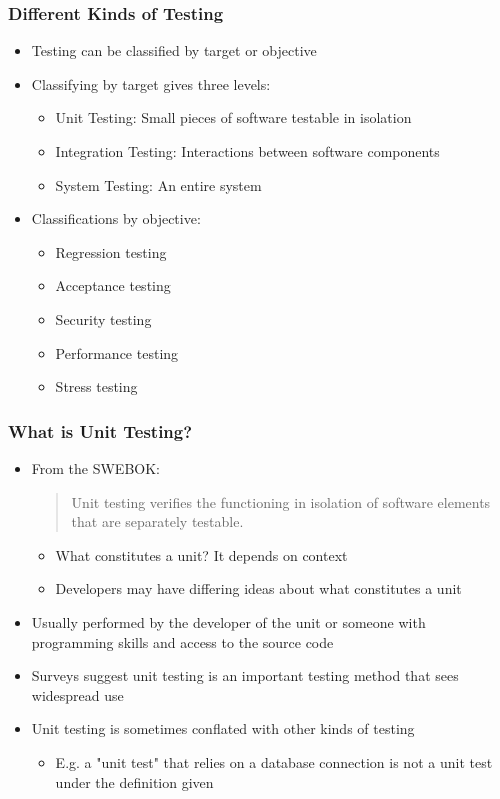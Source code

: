 \documentclass{beamer}
\begin{document}
\begin{frame}
\frametitle{Different Kinds of Testing}
\begin{itemize}
	\item Testing can be classified by target or objective
	\item Classifying by target gives three levels:
	\begin{itemize}
		\item Unit Testing: Small pieces of software testable in isolation
		\item Integration Testing: Interactions between software components
		\item System Testing: An entire system
	\end{itemize}
	\item Classifications by objective: 
	\begin{itemize}
		\item Regression testing
		\item Acceptance testing
		\item Security testing
		\item Performance testing
		\item Stress testing
	\end{itemize}
\end{itemize}
\end{frame}

\begin{frame}
\frametitle{What is Unit Testing?}
\begin{itemize}
	\item From the SWEBOK:\blockcquote{SWEBOK}{Unit testing verifies the functioning in isolation of software elements that are separately testable.}
	\begin{itemize}
 		\item What constitutes a unit? It depends on context
 		\item Developers may have differing ideas about what constitutes a unit
	\end{itemize}
	\item Usually performed by the developer of the unit or someone with programming skills and access to the source code
	\item Surveys suggest unit testing is an important testing method that sees widespread use
	\item Unit testing is sometimes conflated with other kinds of testing
	\begin{itemize}
		\item E.g. a "unit test" that relies on a database connection is not a unit test under the definition given
	\end{itemize}
\end{itemize}
\end{frame}
\end{document}
